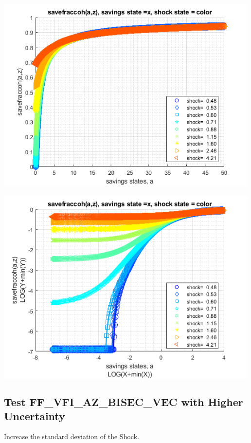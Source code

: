 \documentclass[
]{book}
\begin{document}
\includegraphics[width=5.20833in,height=\textheight]{img/fx_vfi_az_bisec_vec_images/figure_4.png}

\includegraphics[width=5.20833in,height=\textheight]{img/fx_vfi_az_bisec_vec_images/figure_5.png}

\hypertarget{test-ff_vfi_az_bisec_vec-with-higher-uncertainty}{%
\subsection{Test FF\_VFI\_AZ\_BISEC\_VEC with Higher Uncertainty}\label{test-ff_vfi_az_bisec_vec-with-higher-uncertainty}}

Increase the standard deviation of the Shock.
\end{document}
